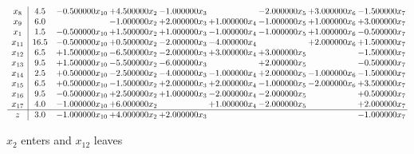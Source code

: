 \documentclass[10pt]{article}
\begin{document}
 \[\begin{array}{c| c c@{\hskip 2pt} c@{\hskip 2pt} c@{\hskip 2pt} c@{\hskip 2pt} c@{\hskip 2pt} c@{\hskip 2pt} c@{\hskip 2pt} }
 x_{8}   &  4.5 & -0.500000 x_{10} & + 4.500000 x_{2} & -1.000000 x_{3} &   & -2.000000 x_{5} & + 3.000000 x_{6} & -1.500000 x_{7}\\
 x_{9}   &  6.0  &   & -1.000000 x_{2} & + 2.000000 x_{3} & + 1.000000 x_{4} & -1.000000 x_{5} & + 1.000000 x_{6} & + 3.000000 x_{7}\\
 x_{1}   &  1.5 & -0.500000 x_{10} & + 1.500000 x_{2} & + 1.000000 x_{3} & -1.000000 x_{4} & -1.000000 x_{5} & + 1.000000 x_{6} & -0.500000 x_{7}\\
 x_{11}   &  16.5 & -0.500000 x_{10} & + 0.500000 x_{2} & -2.000000 x_{3} & -4.000000 x_{4} &   & + 2.000000 x_{6} & + 1.500000 x_{7}\\
 x_{12}   &  6.5 & + 1.500000 x_{10} & -6.500000 x_{2} & -2.000000 x_{3} & + 3.000000 x_{4} & + 3.000000 x_{5} &   & -1.500000 x_{7}\\
 x_{13}   &  9.5 & + 1.500000 x_{10} & -5.500000 x_{2} & -6.000000 x_{3} &   & + 2.000000 x_{5} &   & -0.500000 x_{7}\\
 x_{14}   &  2.5 & + 0.500000 x_{10} & -2.500000 x_{2} & -4.000000 x_{3} & -1.000000 x_{4} & + 2.000000 x_{5} & -1.000000 x_{6} & -1.500000 x_{7}\\
 x_{15}   &  6.5 & + 0.500000 x_{10} & -1.500000 x_{2} & + 2.000000 x_{3} & + 2.000000 x_{4} & -1.000000 x_{5} & -2.000000 x_{6} & + 3.500000 x_{7}\\
 x_{16}   &  9.5 & -0.500000 x_{10} & + 2.500000 x_{2} & + 1.000000 x_{3} & -2.000000 x_{4} & -2.000000 x_{5} &   & + 0.500000 x_{7}\\
 x_{17}   &  4.0 & -1.000000 x_{10} & + 6.000000 x_{2} &   & + 1.000000 x_{4} & -2.000000 x_{5} &   & + 2.000000 x_{7}\\
\hline
z    &  3.0 & -1.000000 x_{10} & + 4.000000 x_{2} & + 2.000000 x_{3} &    &    &   & -1.000000 x_{7}\\
\end{array}\]


 $ x_{2} $ enters and $ x_{12} $ leaves 
\end{document}
